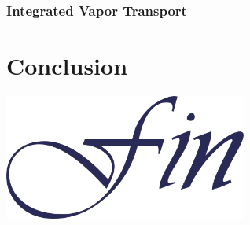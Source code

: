 \documentclass[aspectratio=169]{beamer}
\begin{document}
\begin{frame}
  \frametitle{Integrated Vapor Transport}
  \begin{center}
    
  \end{center}
\end{frame}

\section{Conclusion}

\begin{frame}
  \begin{center}
    \includegraphics[width=0.6\textwidth]{./images/fin}
  \end{center}
\end{frame}
\end{document}
